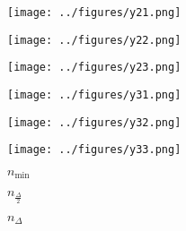 \begin{otherlanguage}{ngerman}
\begin{samepage}
\begin{minipage}{\textwidth}
\vspace{0.125cm}

\begin{minipage}{0.05\textwidth}\centering{}\end{minipage}%
\begin{minipage}{0.3\textwidth}\centering\texttt{[image: ../figures/y21.png]}\end{minipage}%
\begin{minipage}{0.3\textwidth}\centering\texttt{[image: ../figures/y22.png]}\end{minipage}%
\begin{minipage}{0.3\textwidth}\centering\texttt{[image: ../figures/y23.png]}\end{minipage}

\vspace{0.125cm}

\begin{minipage}{0.05\textwidth}\centering{}\end{minipage}%
\begin{minipage}{0.3\textwidth}\centering\texttt{[image: ../figures/y31.png]}\end{minipage}%
\begin{minipage}{0.3\textwidth}\centering\texttt{[image: ../figures/y32.png]}\end{minipage}%
\begin{minipage}{0.3\textwidth}\centering\texttt{[image: ../figures/y33.png]}\end{minipage}

\label{fig:matrix_plot_gauss}

\begin{minipage}{0.05\textwidth}\vspace{0.5cm}\end{minipage}%
\begin{minipage}{0.3\textwidth}\centering \textbf{$n_{\mathrm{min}}$}\end{minipage}%
\begin{minipage}{0.3\textwidth}\centering \textbf{$n_{\frac{\Delta}{2}}$}\end{minipage}%
\begin{minipage}{0.3\textwidth}\centering \textbf{$n_{\Delta}$}\end{minipage}


\end{minipage}
\end{samepage}
\end{otherlanguage}

